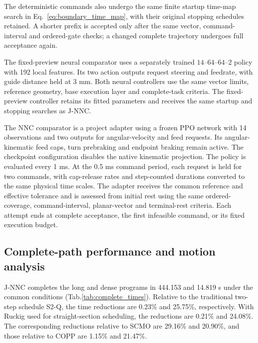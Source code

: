 \documentclass[pdflatex,sn-apa]{sn-jnl}
\begin{document}
The deterministic commands also undergo the same finite startup time-map search in Eq.~\eqref{eq:boundary_time_map}, with their original stopping schedules retained. A shorter prefix is accepted only after the same vector, command-interval and ordered-gate checks; a changed complete trajectory undergoes full acceptance again.

The fixed-preview neural comparator uses a separately trained $14$--$64$--$64$--$2$ policy with 192 local features. Its two action outputs request steering and feedrate, with guide distance held at 3 mm. Both neural controllers use the same vector limits, reference geometry, base execution layer and complete-task criteria. The fixed-preview controller retains its fitted parameters and receives the same startup and stopping searches as J-NNC.

The NNC comparator is a project adapter using a frozen PPO network with 14 observations and two outputs for angular-velocity and feed requests. Its angular-kinematic feed caps, turn prebraking and endpoint braking remain active. The checkpoint configuration disables the native kinematic projection. The policy is evaluated every 1 ms. At the 0.5 ms command period, each request is held for two commands, with cap-release rates and step-counted durations converted to the same physical time scales. The adapter receives the common reference and effective tolerance and is assessed from initial rest using the same ordered-coverage, command-interval, planar-vector and terminal-rest criteria. Each attempt ends at complete acceptance, the first infeasible command, or its fixed execution budget.



\subsection{Complete-path performance and motion analysis}
J-NNC completes the long and dense programs in 444.153{} and 14.819{} s under the common conditions (Tab.\nobreakspace\ref{tab:complete_times}). Relative to the traditional two-step schedule S2-Q, the time reductions are 0.23\% and 25.75\%, respectively. With Ruckig used for straight-section scheduling, the reductions are 0.21\% and 24.08\%. The corresponding reductions relative to SCMO are 29.16\% and 20.90\%, and those relative to COPP are 1.15\% and 21.47\%.
\end{document}

